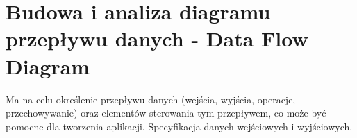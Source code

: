 \section{Budowa i analiza diagramu przepływu danych - Data Flow Diagram }
Ma na celu określenie przepływu danych (wejścia, wyjścia, operacje, przechowywanie) oraz
elementów sterowania tym przepływem, co może być pomocne dla tworzenia aplikacji.
Specyfikacja danych wejściowych i wyjściowych.